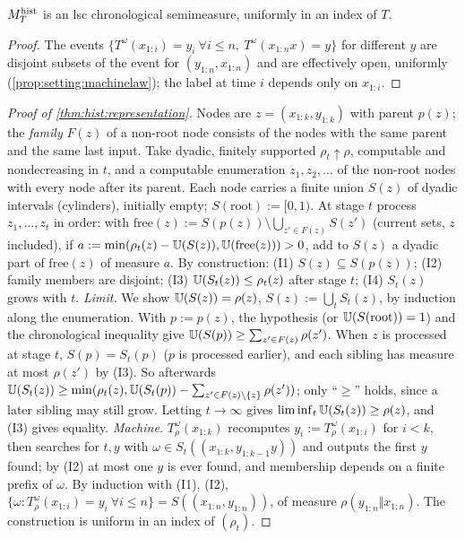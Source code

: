 \begin{lemma}\label{lem:hist:chronolaw}
$M^{\rm hist}_T$ is an lsc chronological semimeasure, uniformly in an index of $T$.
\end{lemma}

\begin{proof}
The events $\{T^\omega(x_{1:i})=y_i\ \forall i\le n,\ T^\omega(x_{1:n}x)=y\}$ for different $y$ are disjoint subsets of the event for $(y_{1:n},x_{1:n})$ and are effectively open, uniformly (\cref{prop:setting:machinelaw}); the label at time $i$ depends only on $x_{1:i}$.
\end{proof}

\begin{proof}[Proof of \cref{thm:hist:representation}]
Nodes are $z=(x_{1:k},y_{1:k})$ with parent $p(z)$; the \emph{family} $F(z)$ of a non-root node consists of the nodes with the same parent and the same last input. Take dyadic, finitely supported $\rho_t\uparrow\rho$, computable and nondecreasing in $t$, and a computable enumeration $z_1,z_2,\dots$ of the non-root nodes with every node after its parent. Each node carries a finite union $S(z)$ of dyadic intervals (cylinders), initially empty; $S(\mathrm{root}):=[0,1)$. At stage $t$ process $z_1,\dots,z_t$ in order: with $\mathrm{free}(z):=S(p(z))\setminus\bigcup_{z'\in F(z)}S(z')$ (current sets, $z$ included), if $a:=\min(\rho_t(z)-\mathbb{U}(S(z)),\mathbb{U}(\mathrm{free}(z)))>0$, add to $S(z)$ a dyadic part of $\mathrm{free}(z)$ of measure $a$. By construction: (I1) $S(z)\subseteq S(p(z))$; (I2) family members are disjoint; (I3) $\mathbb{U}(S_t(z))\le\rho_t(z)$ after stage $t$; (I4) $S_t(z)$ grows with $t$.
\emph{Limit.} We show $\mathbb{U}(S(z))=\rho(z)$, $S(z):=\bigcup_tS_t(z)$, by induction along the enumeration. With $p:=p(z)$, the hypothesis (or $\mathbb{U}(S(\mathrm{root}))=1$) and the chronological inequality give $\mathbb{U}(S(p))\ge\sum_{z'\in F(z)}\rho(z')$. When $z$ is processed at stage $t$, $S(p)=S_t(p)$ ($p$ is processed earlier), and each sibling has measure at most $\rho(z')$ by (I3). So afterwards $\mathbb{U}(S_t(z))\ge\min(\rho_t(z),\mathbb{U}(S_t(p))-\sum_{z'\in F(z)\setminus\{z\}}\rho(z'))$; only ``$\ge$'' holds, since a later sibling may still grow. Letting $t\to\infty$ gives $\liminf_t\mathbb{U}(S_t(z))\ge\rho(z)$, and (I3) gives equality.
\emph{Machine.} $T^\omega_\rho(x_{1:k})$ recomputes $y_i:=T^\omega_\rho(x_{1:i})$ for $i<k$, then searches for $t,y$ with $\omega\in S_t((x_{1:k},y_{1:k-1}y))$ and outputs the first $y$ found; by (I2) at most one $y$ is ever found, and membership depends on a finite prefix of $\omega$. By induction with (I1), (I2), $\{\omega:T^\omega_\rho(x_{1:i})=y_i\ \forall i\le n\}=S((x_{1:n},y_{1:n}))$, of measure $\rho(y_{1:n}\Vert x_{1:n})$. The construction is uniform in an index of $(\rho_t)$.
\end{proof}

